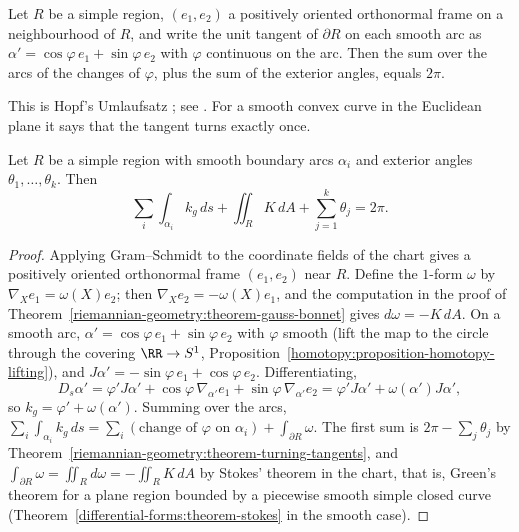 \begin{theorem}\label{riemannian-geometry:theorem-turning-tangents}
Let $R$ be a simple region, $(e_1, e_2)$ a positively oriented orthonormal frame on a neighbourhood of $R$, and write the unit tangent of $\partial R$ on each smooth arc as
$\alpha' = \cos\varphi\,e_1 + \sin\varphi\,e_2$ with $\varphi$ continuous on the arc. Then the sum over the arcs of the changes of $\varphi$, plus the sum of the exterior angles,
equals $2\pi$.
\end{theorem}

This is Hopf's Umlaufsatz \cite{hopf-1935}; see \cite[Chapters 4 and 5]{do-carmo-curves-surfaces}. For a smooth convex curve in the Euclidean plane it says that the tangent turns
exactly once.

\begin{theorem}\label{riemannian-geometry:theorem-local-gauss-bonnet}
Let $R$ be a simple region with smooth boundary arcs $\alpha_i$ and exterior angles $\theta_1, \ldots, \theta_k$. Then
\[
\sum_i\int_{\alpha_i}k_g\,ds + \iint_RK\,dA + \sum_{j=1}^k\theta_j = 2\pi.
\]
\end{theorem}

\begin{proof}
Applying Gram--Schmidt to the coordinate fields of the chart gives a positively oriented orthonormal frame $(e_1, e_2)$ near $R$. Define the $1$-form $\omega$ by
$\nabla_Xe_1 = \omega(X)e_2$; then $\nabla_Xe_2 = -\omega(X)e_1$, and the computation in the proof of Theorem~\ref{riemannian-geometry:theorem-gauss-bonnet} gives
$d\omega = -K\,dA$. On a smooth arc, $\alpha' = \cos\varphi\,e_1 + \sin\varphi\,e_2$ with $\varphi$ smooth (lift the map to the circle through the covering $\RR \to S^1$,
Proposition~\ref{homotopy:proposition-homotopy-lifting}), and $J\alpha' = -\sin\varphi\,e_1 + \cos\varphi\,e_2$. Differentiating,
\[
D_s\alpha' = \varphi'J\alpha' + \cos\varphi\,\nabla_{\alpha'}e_1 + \sin\varphi\,\nabla_{\alpha'}e_2 = \varphi'J\alpha' + \omega(\alpha')J\alpha',
\]
so $k_g = \varphi' + \omega(\alpha')$. Summing over the arcs, $\sum_i\int_{\alpha_i}k_g\,ds = \sum_i(\text{change of }\varphi\text{ on }\alpha_i) + \int_{\partial R}\omega$. The first sum is
$2\pi - \sum_j\theta_j$ by Theorem~\ref{riemannian-geometry:theorem-turning-tangents}, and $\int_{\partial R}\omega = \iint_Rd\omega = -\iint_RK\,dA$ by Stokes' theorem in the chart, that
is, Green's theorem for a plane region bounded by a piecewise smooth simple closed curve \cite[Chapter 4]{do-carmo-curves-surfaces}
(Theorem~\ref{differential-forms:theorem-stokes} in the smooth case).
\end{proof}

